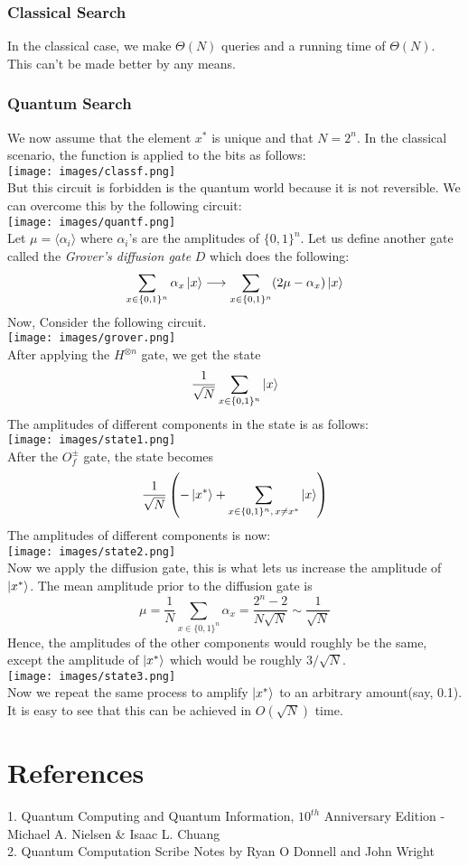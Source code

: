 \documentclass{article}
\begin{document}
\subsubsection{Classical Search}
In the classical case, we make $\Theta(N)$ queries and a running time of $\Theta(N)$. This can't be made better by any means.

\subsubsection{Quantum Search}
We now assume that the element $x^*$ is unique and that $N = 2^n$. In the classical scenario, the function is applied to the bits as follows:\\
\texttt{[image: images/classf.png]}\\
But this circuit is forbidden is the quantum world because it is not reversible. We can overcome this by the following circuit:\\
\texttt{[image: images/quantf.png]}\\
Let $\mu = \langle \alpha_i \rangle$ where $\alpha_i$'s are the amplitudes of $\{0, 1\}^n$.
Let us define another gate called the \textit{Grover's diffusion gate} $D$ which does the following:
$$\sum_{x \in \{0, 1\}^n} \alpha_x \ket{x} \longrightarrow \sum_{x \in \{0, 1\}^n} (2\mu - \alpha_x) \ket{x}$$
Now, Consider the following circuit.\\
\texttt{[image: images/grover.png]}\\
\cleardoublepage
After applying the $H^{\otimes n}$ gate, we get the state $$\frac{1}{\sqrt{N}}\sum_{x \in \{0, 1\}^n} \ket{x}$$
The amplitudes of different components in the state is as follows:\\[3pt]
\texttt{[image: images/state1.png]}\\
After the $O_f^{\pm}$ gate, the state becomes
$$\frac{1}{\sqrt{N}}\left( -\ket{x^*} + \sum_{x \in \{0, 1\}^n,\, x \ne x^*} \ket{x} \right)$$
The amplitudes of different components is now:\\[3pt]
\texttt{[image: images/state2.png]}\\
Now we apply the diffusion gate, this is what lets us increase the amplitude of $\ket{x^*}$. The mean amplitude prior to the diffusion gate is $$\mu = \frac{1}{N} \sum_{x \in \{0, 1\}^n}\alpha_x = \frac{2^n-2}{N\sqrt{N}} \sim \frac{1}{\sqrt{N}}$$
Hence, the amplitudes of the other components would roughly be the same, except the amplitude of $\ket{x^*}$ which would be roughly $3/\sqrt{N}$.\\
\texttt{[image: images/state3.png]}\\
Now we repeat the same process to amplify $\ket{x^*}$ to an arbitrary amount(say, 0.1). It is easy to see that this can be achieved in $O(\sqrt{N})$ time.
\cleardoublepage
\section*{References}
1. Quantum Computing and Quantum Information, $10^{th}$ Anniversary Edition - Michael A. Nielsen & Isaac L. Chuang\\
2. Quantum Computation Scribe Notes by Ryan O Donnell and John Wright
\end{document}
